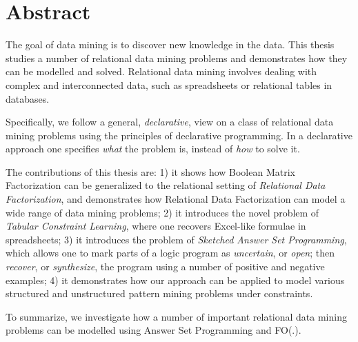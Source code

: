 \chapter{Abstract} \label{ch:abstract}
The goal of data mining is to discover new knowledge in the data. This
thesis studies a number of relational data mining problems and
demonstrates how they can be modelled and solved. Relational data
mining involves dealing with complex and interconnected data, such as
spreadsheets or relational tables in databases. 

Specifically, we follow a general, \textit{declarative}, view on a
class of relational data mining problems using the principles of
declarative programming. In a declarative approach one specifies \textit{what} the
problem is, instead of \textit{how} to solve it. 

The contributions of this thesis are: 1) it shows how Boolean Matrix Factorization can be generalized to the
relational setting of \textit{Relational Data Factorization}, and 
demonstrates how Relational Data Factorization can model a wide range
of data mining problems; 2) it introduces the novel
problem of \textit{Tabular Constraint Learning}, where one recovers
Excel-like formulae in spreadsheets; 3) it introduces the problem of \textit{Sketched Answer Set
Programming}, which allows one to mark parts of a logic program as
\textit{uncertain}, or \textit{open}; then \textit{recover}, or
\textit{synthesize}, the program using a number of positive and
negative examples; 4) it demonstrates how our approach can be
applied to model various structured and unstructured pattern mining
problems under constraints.

\pubrev
To summarize, we investigate how a number of important relational data
mining problems can be modelled using Answer Set Programming and FO(.). 
\pubrevend

\cleardoublepage

